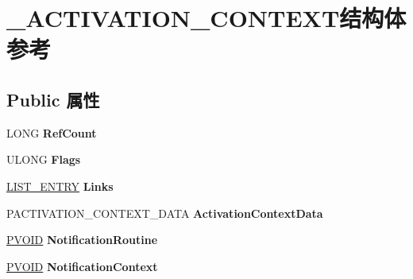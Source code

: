 \hypertarget{struct___a_c_t_i_v_a_t_i_o_n___c_o_n_t_e_x_t}{}\section{\+\_\+\+A\+C\+T\+I\+V\+A\+T\+I\+O\+N\+\_\+\+C\+O\+N\+T\+E\+X\+T结构体 参考}
\label{struct___a_c_t_i_v_a_t_i_o_n___c_o_n_t_e_x_t}
\subsection*{Public 属性}
\begin{DoxyCompactItemize}
\item 
\mbox{\label{struct___a_c_t_i_v_a_t_i_o_n___c_o_n_t_e_x_t_ad75ab68efb56a6749aad186f30d3a7e7}} 
L\+O\+NG {\bfseries Ref\+Count}
\item 
\mbox{\label{struct___a_c_t_i_v_a_t_i_o_n___c_o_n_t_e_x_t_a256273bf6542e4122ba449db5c68fa8f}} 
U\+L\+O\+NG {\bfseries Flags}
\item 
\mbox{\label{struct___a_c_t_i_v_a_t_i_o_n___c_o_n_t_e_x_t_a6fe170bb45bc27a368ca9392c423b889}} 
\hyperlink{struct___l_i_s_t___e_n_t_r_y}{L\+I\+S\+T\+\_\+\+E\+N\+T\+RY} {\bfseries Links}
\item 
\mbox{\label{struct___a_c_t_i_v_a_t_i_o_n___c_o_n_t_e_x_t_a361ace786715fa5132157682b5f798a7}} 
P\+A\+C\+T\+I\+V\+A\+T\+I\+O\+N\+\_\+\+C\+O\+N\+T\+E\+X\+T\+\_\+\+D\+A\+TA {\bfseries Activation\+Context\+Data}
\item 
\mbox{\label{struct___a_c_t_i_v_a_t_i_o_n___c_o_n_t_e_x_t_a37e04eb77173c0fa1f98d39a30c15eb3}} 
\hyperlink{interfacevoid}{P\+V\+O\+ID} {\bfseries Notification\+Routine}
\item 
\mbox{\label{struct___a_c_t_i_v_a_t_i_o_n___c_o_n_t_e_x_t_a1469033b60d42b6009be3f385f1788da}} 
\hyperlink{interfacevoid}{P\+V\+O\+ID} {\bfseries Notification\+Context}
\item 

\end{DoxyCompactItemize}
